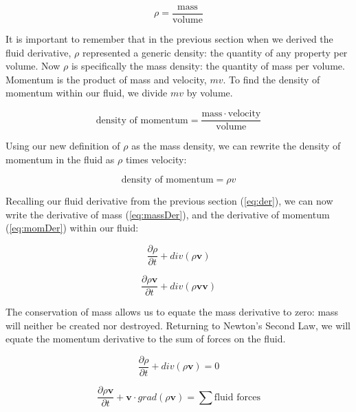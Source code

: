 \documentclass[twocolumn,12pth]{article}
\begin{document}
\begin{equation}
\rho = \frac{\mathrm{mass}}{\mathrm{volume}}
\end{equation}

It is important to remember that in the previous section when we derived the fluid derivative, $\rho$ represented a generic density: the quantity of any property per volume.
Now $\rho$ is specifically the mass density: the quantity of mass per volume.
Momentum is the product of mass and velocity, $mv$.
To find the density of momentum within our fluid, we divide $mv$ by volume.

\begin{equation}
\mathrm{density \,\, of \,\, momentum} = \frac{\mathrm{mass} \cdot \mathrm{velocity}}{\mathrm{volume}}
\end{equation}

Using our new definition of $\rho$ as the mass density, we can rewrite the density of momentum in the fluid as $\rho$ times velocity:

\begin{equation}
\mathrm{density \,\, of \,\, momentum} = \rho{v}
\end{equation}

Recalling our fluid derivative from the previous section (\ref{eq:der}), we can now write the derivative of mass (\ref{eq:massDer}), and the derivative of momentum (\ref{eq:momDer}) within our fluid:

\begin{equation}
\frac{\partial{\rho}}{\partial{t}} + div(\rho \mathbf{v})
\label{eq:massDer}
\end{equation}

\begin{equation}
\frac{\partial{\rho}\mathbf{v}}{\partial{t}} + div(\rho \mathbf{vv})
\label{eq:momDer}
\end{equation}

The conservation of mass allows us to equate the mass derivative to zero: mass will neither be created nor destroyed. \cite{Ferziger2002}
Returning to Newton's Second Law, we will equate the momentum derivative to the sum of forces on the fluid.


\begin{equation}
\frac{\partial{\rho}}{\partial{t}} + div(\rho \mathbf{v}) = 0
\label{eq:massDer2}
\end{equation}

\begin{equation}
\frac{\partial{\rho}\mathbf{v}}{\partial{t}} + \mathbf{v} \cdot grad(\rho \mathbf{v}) = \sum{\mathrm{fluid \,\, forces}}
\label{eq:momDer2}
\end{equation}
\end{document}
